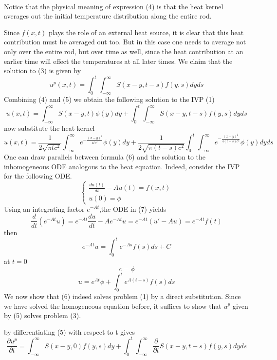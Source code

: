 \documentclass[]{article}
\begin{document}
\\
Notice that the physical meaning of expression (4) is that the heat
kernel averages out the initial temperature distribution along the entire rod.
\par
Since $f(x, t)$ plays the role of an external heat source, it is clear that this heat contribution must be averaged out too. 
But in this case one needs to average not only over the entire rod, but over time as well, 
since the heat contribution at an earlier time will effect the temperatures at all later times. 
We claim that the solution to (3) is given by
\begin{equation}
    u^p(x,t) = \int_{0}^{t}\int_{-\infty}^{\infty}S(x-y,t-s) f(y,s)dyds
\end{equation}
Combining (4) and (5) we obtain the following solution to the IVP (1)
\begin{equation}
    u(x,t)  = \int_{-\infty}^{\infty}S(x-y,t) \phi(y)dy + \int_{0}^{t}\int_{-\infty}^{\infty}S(x-y,t-s) f(y,s)dyds
\end{equation}
now substitute the heat kernel
\[
    u(x,t) = \frac{1}{2\sqrt{\pi tc^2}}\int_{-\infty}^{\infty}e^{-\frac{{(x-y)}^2}{4tc^2}} \phi(y)dy + \frac{1}{2\sqrt{\pi (t-s)c^2}} \int_{0}^{t} \int_{-\infty}^{\infty}e^{-\frac{{(x-y)}^2}{4(t-s)c^2}} \phi(y)dyds            
\]
One can draw parallels between formula (6) and the solution to the inhomogeneous ODE analogous
to the heat equation. Indeed, consider the IVP for the following ODE.
\begin{equation}
    \begin{cases}
        \frac{du(t)}{dt} - A u(t) = f(x,t)
        \\
        u(0) = \phi
    \end{cases}
\end{equation}
Using an integrating factor $e^{-At}$,the ODE in (7) yields
\[
\frac{d}{dt}\left(e^{-At}u\right)= e^{-At} \frac{du}{dt} - Ae^{-At} u  = e^{-At}(u'-Au) = e^{-At} f(t)
\]
then
\[
    e^{-At}u = \int_{0}^{t} e^{-As} f(s)ds + C
\]
at $t=0$
\[
c = \phi    
\]
\[
    u = e^{At}\phi + \int_{0}^{t} e^{A(t-s)} f(s)ds
\]
We now show that (6) indeed solves problem (1) by a direct substitution. 
Since we have solved the homogeneous equation before, it suffices to show that $u^p$ given by (5) solves problem (3). 
\par
by differentiating (5) with respect to t gives
\[
    \frac{\partial u^p}{\partial t} = \int_{-\infty}^{\infty}S(x-y,0) f(y,s) dy  + \int_{0}^{t}\int_{-\infty}^{\infty}\frac{\partial}{\partial t}S(x-y,t-s) f(y,s)dyds    
\]
\end{document}
